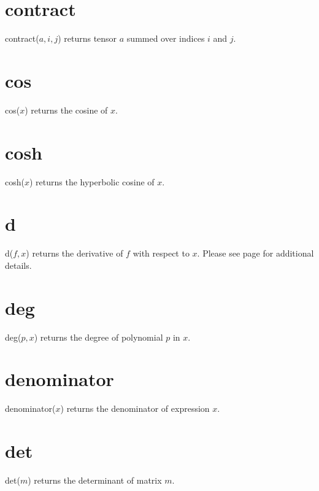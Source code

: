 \documentclass[12pt,openany]{report}
\begin{document}
\section*{contract}
contract($a,i,j$) returns tensor $a$ summed over indices $i$ and $j$.

\section*{cos}
cos($x$) returns the cosine of $x$.

\section*{cosh}
cosh($x$) returns the hyperbolic cosine of $x$.

\section*{d}
d($f,x$) returns the derivative of $f$ with respect to $x$.
Please see page \pageref{d} for additional details.

\section*{deg}
deg($p,x$) returns the degree of polynomial $p$ in $x$.

\section*{denominator}
denominator($x$) returns the denominator of expression $x$.

\section*{det}
det($m$) returns the determinant of matrix $m$.
\end{document}
